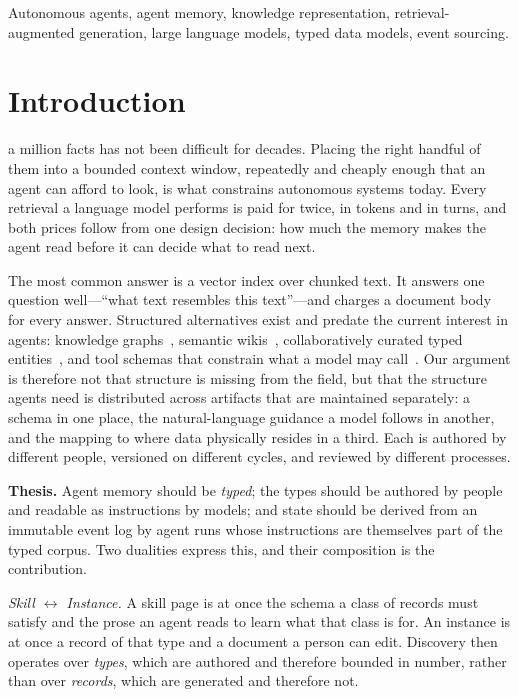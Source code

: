 \documentclass[journal,nofonttune]{IEEEtran}
\begin{document}
\begin{IEEEkeywords}
Autonomous agents, agent memory, knowledge representation, retrieval-augmented
generation, large language models, typed data models, event sourcing.
\end{IEEEkeywords}

\section{Introduction}
 a million facts has not been difficult for decades.
Placing the right handful of them into a bounded context window, repeatedly
and cheaply enough that an agent can afford to look, is what constrains
autonomous systems today. Every retrieval a language model performs is paid
for twice, in tokens and in turns, and both prices follow from one design
decision: how much the memory makes the agent read before it can decide what
to read next.

The most common answer is a vector index over chunked text. It answers one
question well---``what text resembles this text''---and charges a document
body for every answer. Structured alternatives exist and predate the current
interest in agents: knowledge graphs~\cite{kgsurvey}, semantic
wikis~\cite{semanticwiki}, collaboratively curated typed
entities~\cite{wikidata,schemaorg}, and tool schemas that constrain what a
model may call~\cite{toolformer}. Our argument is therefore not that
structure is missing from the field, but that the structure agents need is
distributed across artifacts that are maintained separately: a schema in one
place, the natural-language guidance a model follows in another, and the
mapping to where data physically resides in a third. Each is authored by
different people, versioned on different cycles, and reviewed by different
processes.

\textbf{Thesis.} Agent memory should be \emph{typed}; the types should be
authored by people and readable as instructions by models; and state should
be derived from an immutable event log by agent runs whose instructions are
themselves part of the typed corpus. Two dualities express this, and their
composition is the contribution.

\emph{Skill $\leftrightarrow$ Instance.} A skill page is at once the schema a
class of records must satisfy and the prose an agent reads to learn what that
class is for. An instance is at once a record of that type and a document a
person can edit. Discovery then operates over \emph{types}, which are
authored and therefore bounded in number, rather than over \emph{records},
which are generated and therefore not.
\end{document}
